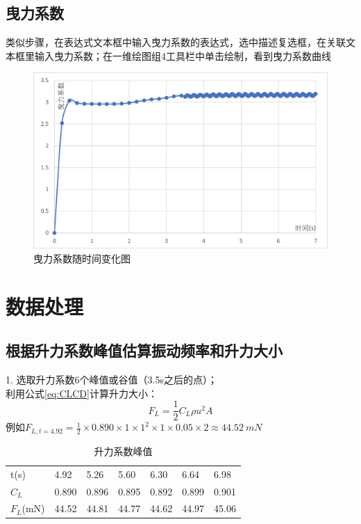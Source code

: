 \documentclass[a4paper,zihao=5,UTF8,fontset=fandol]{phyreport}
\begin{document}
\subsection{曳力系数}
类似步骤，在表达式文本框中输入曳力系数的表达式，选中描述复选框，在关联文本框里输入曳力系数；在一维绘图组4工具栏中单击绘制，看到曳力系数曲线
\begin{figure}[h!]
  \centering
  \includegraphics[width=0.7\linewidth]{曳力系数.png}
  \caption{曳力系数随时间变化图}
\end{figure}

\longLine
\section{数据处理}
\subsection{根据升力系数峰值估算振动频率和升力大小}
1. 选取升力系数6个峰值或谷值（3.5s之后的点）；\\
利用公式\ref{eq:CLCD}计算升力大小：
$$F_L=\frac{1}{2}C_L \rho u^2 A$$
例如$F_{L,t=4.92}=\frac{1}{2}\times0.890\times1\times1^2\times1\times0.05\times2\approx\qty{44.52}{mN}$

\begin{table}[h!]
  \centering
  \begin{tabular}{@{}lllllll@{}}
  \toprule
  t(s)   & 4.92  & 5.26 & 5.60 & 6.30  & 6.64 & 6.98 \\
$C_L$     & 0.890 & 0.896 & 0.895 & 0.892 & 0.899 & 0.901 \\
$F_L$(mN) & 44.52 & 44.81 & 44.77 & 44.62 & 44.97 & 45.06 \\ \bottomrule
  \end{tabular}
  \caption{升力系数峰值}
  \end{table}
\end{document}
